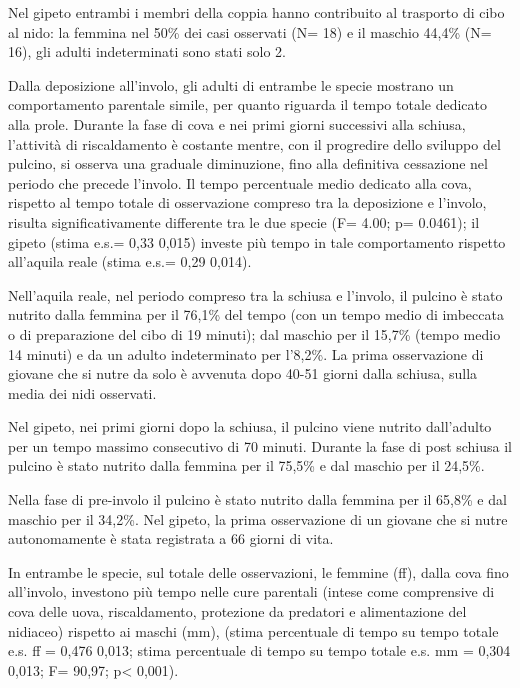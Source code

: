 Nel gipeto entrambi i membri della coppia hanno contribuito al trasporto
di cibo al nido: la femmina nel 50\% dei casi osservati (N= 18) e il
maschio 44,4\% (N= 16), gli adulti indeterminati sono stati solo 2.

Dalla deposizione all{\textquoteright}involo, gli adulti di entrambe le
specie mostrano un comportamento parentale simile, per quanto riguarda
il tempo totale dedicato alla prole. Durante la fase di cova e nei
primi giorni successivi alla schiusa, l{\textquoteright}attivit\`a di
riscaldamento \`e costante mentre, con il progredire dello sviluppo del
pulcino, si osserva una graduale diminuzione, fino alla definitiva
cessazione nel periodo che precede l{\textquoteright}involo. Il tempo
percentuale medio dedicato alla cova, rispetto al tempo totale di
osservazione compreso tra la deposizione e l{\textquoteright}involo,
risulta significativamente differente tra le due specie (F= 4.00; p=
0.0461); il gipeto (stima {\textpm} e.s.= 0,33 {\textpm} 0,015) investe
pi\`u tempo in tale comportamento rispetto all{\textquoteright}aquila
reale (stima {\textpm} e.s.= 0,29 {\textpm} 0,014).

Nell{\textquoteright}aquila reale, nel periodo compreso tra la schiusa e
l{\textquoteright}involo, il pulcino \`e stato nutrito dalla femmina
per il 76,1\% del tempo (con un tempo medio di imbeccata o di
preparazione del cibo di 19 minuti); dal maschio per il 15,7\% (tempo
medio 14 minuti) e da un adulto indeterminato per
l{\textquoteright}8,2\%. La prima osservazione di giovane che si nutre
da solo \`e avvenuta dopo 40-51 giorni dalla schiusa, sulla media dei
nidi osservati.

Nel gipeto, nei primi giorni dopo la schiusa, il pulcino viene nutrito
dall{\textquoteright}adulto per un tempo massimo consecutivo di 70
minuti. Durante la fase di post schiusa il pulcino \`e stato nutrito
dalla femmina per il 75,5\% e dal maschio per il 24,5\%. 

Nella fase di pre-involo il pulcino \`e stato nutrito dalla femmina per
il 65,8\% e dal maschio per il 34,2\%. Nel gipeto, la prima
osservazione di un giovane che si nutre autonomamente \`e stata
registrata a 66 giorni di vita.

In entrambe le specie, sul totale delle osservazioni, le femmine (ff),
dalla cova fino all{\textquoteright}involo, investono pi\`u tempo nelle
cure parentali (intese come comprensive di cova delle uova,
riscaldamento, protezione da predatori e alimentazione del nidiaceo)
rispetto ai maschi (mm), (stima percentuale di tempo su tempo totale
{\textpm} e.s. ff = 0,476 {\textpm} 0,013; stima percentuale di tempo
su tempo totale {\textpm} e.s. mm = 0,304 {\textpm} 0,013; F= 90,97;
p{\textless} 0,001). 

